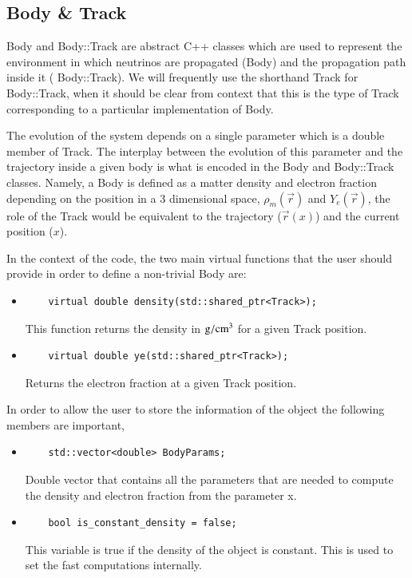 \documentclass[3p,12pt]{elsarticle}
\newcommand{\ttf}{\ttfamily}
\begin{document}
\subsection{Body \& Track \label{sec:body_track}}

{\ttf Body} and {\ttf Body::Track} are abstract {\ttf C++} classes
which are used to represent the environment in which neutrinos
are propagated ({\ttf Body}) and the propagation path inside it ({\ttf
  Body::Track}). We will frequently use the shorthand {\ttf Track} for {\ttf Body::Track},
 when it should be clear from context that this is the type of {\ttf Track} 
 corresponding to a particular implementation of {\ttf Body}.

The evolution of the system depends on a single parameter which is a
{\ttf double} member of {\ttf Track}. The
interplay between the evolution of this parameter and the trajectory
inside a given body is what is encoded in the {\ttf Body} and 
{\ttf Body::Track} classes. 
Namely, a {\ttf Body} is defined as a matter density and electron
fraction depending on the position in a 3 dimensional space, $\rho_m(\vec{r})$ and
$Y_e(\vec{r})$, the role of the {\ttf Track} would be
equivalent to the trajectory ($\vec{r}(x)$) and the current position ($x$).

In the context of the code, the two main virtual functions that the
user should provide in order to define a non-trivial {\ttf Body} are:
\begin{itemize}
\item 
  \begin{lstlisting}
    virtual double density(std::shared_ptr<Track>);
  \end{lstlisting}
This function returns the density in ${\rm g}/{\rm cm}^3$ for a
given {\ttf Track} position.
\item 
  \begin{lstlisting}
    virtual double ye(std::shared_ptr<Track>);
  \end{lstlisting}
Returns the electron fraction at a given {\ttf Track} position.
\end{itemize}

In order to allow the user to store the information of the
object the following members are important,

\begin{itemize}
\item  
  \begin{lstlisting}
    std::vector<double> BodyParams;
  \end{lstlisting}
  Double vector that contains all the parameters that are
  needed to compute the density and electron fraction from the parameter
  {\ttf x}.
  
\item  
  \begin{lstlisting}
    bool is_constant_density = false;
  \end{lstlisting}  
  This variable is {\ttf true} if the density of the object is constant. This is
  used to set the fast computations internally.
\end{itemize}
\end{document}
